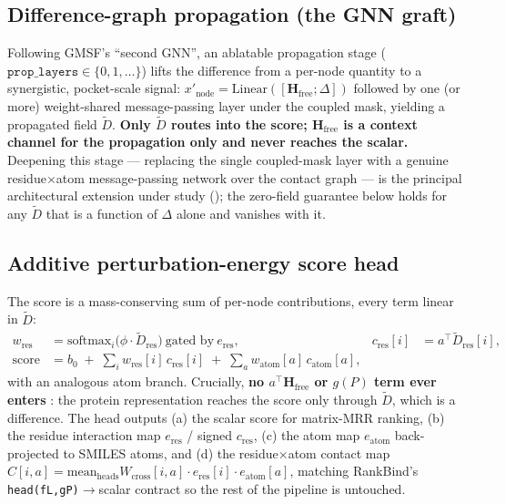 \documentclass[11pt,a4paper]{article}
\newcommand{\method}{RankBind\xspace}
\newcommand{\Hfree}{\mathbf{H}_{\text{free}}}
\begin{document}
\subsection{Difference-graph propagation (the GNN graft)}
\label{sec:prop}
Following GMSF's ``second GNN'', an ablatable propagation stage
($\texttt{prop\_layers}\in\{0,1,\dots\}$) lifts the difference from a per-node
quantity to a synergistic, pocket-scale signal:
$x'_{\text{node}}=\mathrm{Linear}([\Hfree;\Delta])$ followed by one (or more)
weight-shared message-passing layer under the coupled mask, yielding a
propagated field $\tilde{D}$. \textbf{Only $\tilde{D}$ routes into the score;
$\Hfree$ is a context channel for the propagation only and never reaches the
scalar.} Deepening this stage --- replacing the single coupled-mask layer with
a genuine residue$\times$atom message-passing network over the contact graph
--- is the principal architectural extension under study
(); the zero-field guarantee below holds for any
$\tilde{D}$ that is a function of $\Delta$ alone and vanishes with it.

\subsection{Additive perturbation-energy score head}
The score is a mass-conserving sum of per-node contributions, every term
linear in $\tilde{D}$:
\begin{align}
w_{\text{res}} &= \mathrm{softmax}_i\!\big(\phi\cdot \tilde{D}_{\text{res}}\big)\ \text{gated by}\ e_{\text{res}}, &
c_{\text{res}}[i] &= a^{\top}\tilde{D}_{\text{res}}[i], \\
\text{score} &= b_0 \;+\; \sum_i w_{\text{res}}[i]\,c_{\text{res}}[i] \;+\; \sum_a w_{\text{atom}}[a]\,c_{\text{atom}}[a], \label{eq:score}
\end{align}
with an analogous atom branch. Crucially, \textbf{no $a^{\top}\Hfree$ or
$g(P)$ term ever enters }: the protein representation reaches
the score only through $\tilde{D}$, which is a difference. The head outputs
(a) the scalar score for matrix-MRR ranking, (b) the residue interaction map
$e_{\text{res}}$ / signed $c_{\text{res}}$, (c) the atom map $e_{\text{atom}}$
back-projected to SMILES atoms, and (d) the residue$\times$atom contact map
$C[i,a]=\mathrm{mean}_{\text{heads}}W_{\text{cross}}[i,a]\cdot
e_{\text{res}}[i]\cdot e_{\text{atom}}[a]$, matching \method's
\texttt{head(fL,gP)}$\to$scalar contract so the rest of the pipeline is
untouched.
\end{document}
